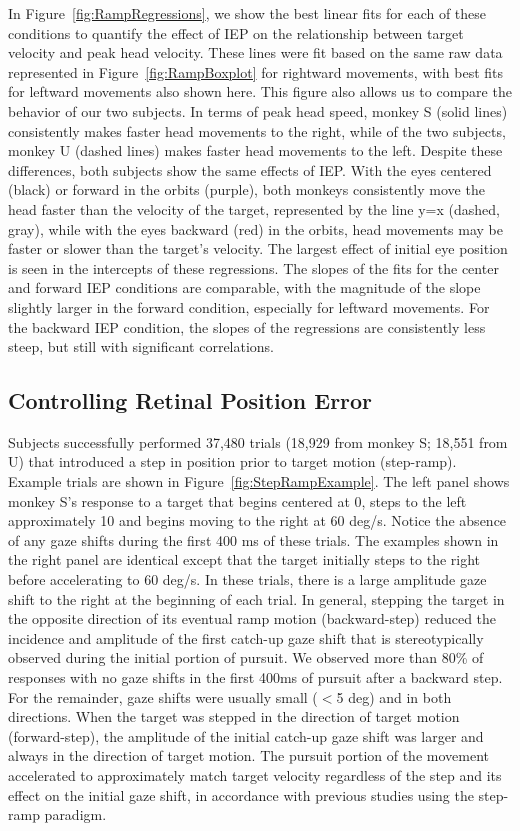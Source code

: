 \documentclass[12pt]{article}
\begin{document}
In Figure~\ref{fig:RampRegressions}, we show the best linear fits for each of these conditions to quantify the effect of IEP on the relationship between target velocity and peak head velocity. These lines were fit based on the same raw data represented in Figure~\ref{fig:RampBoxplot} for rightward movements, with best fits for leftward movements also shown here. This figure also allows us to compare the behavior of our two subjects. In terms of peak head speed, monkey S (solid lines) consistently makes faster head movements to the right, while of the two subjects, monkey U (dashed lines) makes faster head movements to the left. Despite these differences, both subjects show the same effects of IEP. With the eyes centered (black) or forward in the orbits (purple), both monkeys consistently move the head faster than the velocity of the target, represented by the line y=x (dashed, gray), while with the eyes backward (red) in the orbits, head movements may be faster or slower than the target’s velocity. The largest effect of initial eye position is seen in the intercepts of these regressions. The slopes of the fits for the center and forward IEP conditions are comparable, with the magnitude of the slope slightly larger in the forward condition, especially for leftward movements. For the backward IEP condition, the slopes of the regressions are consistently less steep, but still with significant correlations.

\subsection{Controlling Retinal Position Error}
Subjects successfully performed 37,480 trials (18,929 from monkey S; 18,551 from U) that introduced a step in position prior to target motion (step-ramp). Example trials are shown in Figure~\ref{fig:StepRampExample}. The left panel shows monkey S’s response to a target that begins centered at 0\textdegree{}, steps to the left approximately 10\textdegree{} and begins moving to the right at 60 deg/s. Notice the absence of any gaze shifts during the first 400 ms of these trials. The examples shown in the right panel are identical except that the target initially steps to the right before accelerating to 60 deg/s. In these trials, there is a large amplitude gaze shift to the right at the beginning of each trial. In general, stepping the target in the opposite direction of its eventual ramp motion (backward-step) reduced the incidence and amplitude of the first catch-up gaze shift that is stereotypically observed during the initial portion of pursuit. We observed more than 80\% of responses with no gaze shifts in the first 400ms of pursuit after a backward step. For the remainder, gaze shifts were usually small ($<$5 deg) and in both directions. When the target was stepped in the direction of target motion (forward-step), the amplitude of the initial catch-up gaze shift was larger and always in the direction of target motion. The pursuit portion of the movement accelerated to approximately match target velocity regardless of the step and its effect on the initial gaze shift, in accordance with previous studies using the step-ramp paradigm. 
\end{document}
